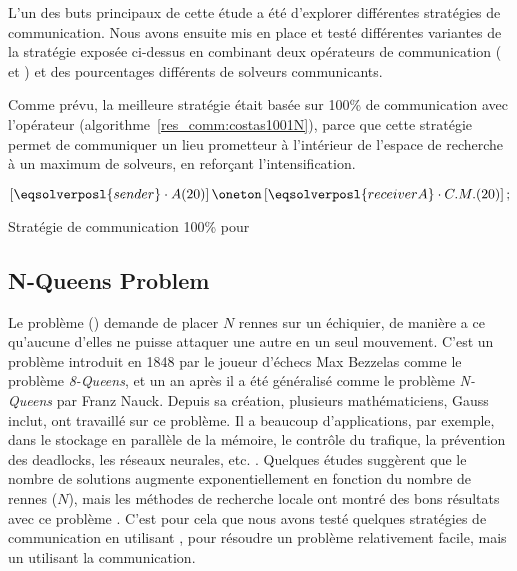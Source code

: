 L'un des buts principaux de cette étude a été d'explorer différentes stratégies de communication. Nous avons ensuite mis en place et testé différentes variantes de la stratégie exposée ci-dessus en combinant deux opérateurs de communication (\oneTone{} et \oneTn) et des pourcentages différents de solveurs communicants. 

Comme prévu, la meilleure stratégie était basée sur 100\% de communication avec l'opérateur \oneTn{} (algorithme~\ref{res_comm:costas1001N}), parce que cette stratégie permet de communiquer un lieu prometteur à l'intérieur de l'espace de recherche à un maximum de solveurs, en refor\c{c}ant l'intensification.

\begin{algorithm}[!h]
\dontprintsemicolon
\SetNoline
$\left[\eqsolverposl{sender}\cdot A(20)\right] \oneton \left[\eqsolverposl{receiverA}\cdot C.M.(20)\right];$
\caption{Stratégie de communication \oneTn{} 100\% pour \CARRP}\label{res_comm:costas1001N}
\end{algorithm}




\subsection{N-Queens Problem}

Le problème \nq{} (\NQP) demande de placer $N$ rennes sur un échiquier, de manière a ce qu'aucune d'elles ne puisse attaquer une autre en un seul mouvement. C'est un problème introduit en 1848 par le joueur d'échecs Max Bezzelas comme le problème \textit{8-Queens}, et un an après il a été généralisé comme le problème \textit{N-Queens} par Franz Nauck. Depuis sa création, plusieurs mathématiciens, Gauss inclut, ont travaillé sur ce problème. Il a beaucoup d'applications, par exemple, dans le stockage en parallèle de la mémoire, le contrôle du trafique, la prévention des deadlocks, les réseaux neurales, etc. \cite{Bell2009}. Quelques études suggèrent que le nombre de solutions augmente exponentiellement en fonction du nombre de rennes ($N$), mais les méthodes de recherche locale ont montré des bons résultats avec ce problème \cite{Sosic1994}. C'est pour cela que nous avons testé quelques stratégies de communication en utilisant \posl{}, pour résoudre un problème relativement facile, mais un utilisant la communication.

